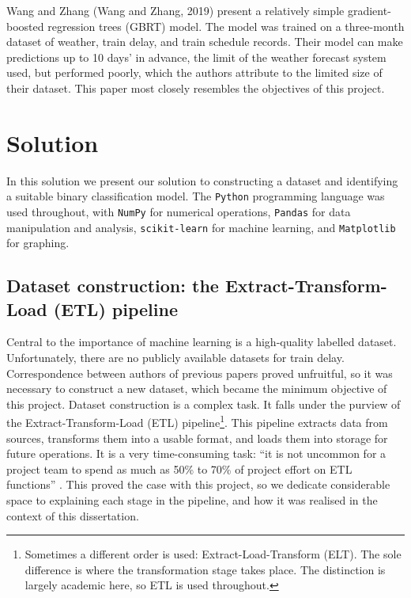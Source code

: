 \documentclass[12pt,a4paper]{article}
\begin{document}
Wang and Zhang (Wang and Zhang, 2019) present a relatively simple gradient-boosted regression trees (GBRT) model. The model was trained on a three-month dataset of weather, train delay, and train schedule records. Their model can make predictions up to 10 days’ in advance, the limit of the weather forecast system used, but performed poorly, which the authors attribute to the limited size of their dataset. This paper most closely resembles the objectives of this project. 

\clearpage
\section{Solution}
\label{section:solution}

In this solution we present our solution to constructing a dataset and identifying a suitable binary classification model. The \verb|Python| programming language was used throughout, with \verb|NumPy| for numerical operations, \verb|Pandas| for data manipulation and analysis, \verb|scikit-learn| for machine learning, and \verb|Matplotlib| for graphing. 

\subsection{Dataset construction: the Extract-Transform-Load (ETL) pipeline}

Central to the importance of machine learning is a high-quality labelled dataset. Unfortunately, there are no publicly available datasets for train delay. Correspondence between authors of previous papers \cite{yaghini_et_al_2013,wang_zhang_2019} proved unfruitful, so it was necessary to construct a new dataset, which became the minimum objective of this project. Dataset construction is a complex task. It falls under the purview of the Extract-Transform-Load (ETL) pipeline\footnote{Sometimes a different order is used: Extract-Load-Transform (ELT). The sole difference is where the transformation stage takes place. The distinction is largely academic here, so ETL is used throughout.}. This pipeline extracts data from sources, transforms them into a usable format, and loads them into storage for future operations. It is a very time-consuming task: “it is not uncommon for a project team to spend as much as 50\% to 70\% of project effort on ETL functions” \cite[p.~284]{ponniah_2010}. This proved the case with this project, so we dedicate considerable space to explaining each stage in the pipeline, and how it was realised in the context of this dissertation.
\end{document}

